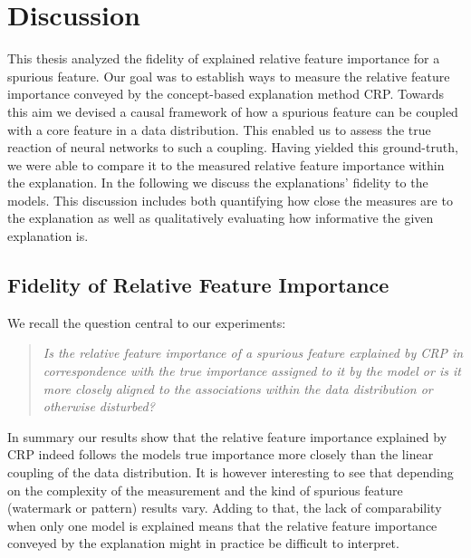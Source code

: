 \chapter{Discussion}\label{chapter:discussion}
This thesis analyzed the fidelity of explained relative feature importance for a spurious feature. 
Our goal was to establish ways to measure the relative feature importance conveyed by the concept-based explanation method CRP.
Towards this aim we devised a causal framework of how a spurious feature can be coupled with a core feature in a data distribution. This enabled us to assess the true reaction of neural networks to such a coupling. Having yielded this ground-truth, we were able to compare it to the measured relative feature importance within the explanation. 
In the following we discuss the explanations' fidelity to the models. This discussion includes both quantifying how close the measures are to the explanation as well as qualitatively evaluating how informative the given explanation is. 

\section{Fidelity of Relative Feature Importance}
We recall the question central to our experiments:
\begin{quote}
    \textit{Is the relative feature importance of a spurious feature explained by CRP in correspondence with the true importance assigned to it by the model or is it more closely aligned to the associations within the data distribution or otherwise disturbed?}
\end{quote}

In summary our results show that the relative feature importance explained by CRP indeed follows the models true importance more closely than the linear coupling of the data distribution. 
It is however interesting to see that depending on the complexity of the measurement and the kind of spurious feature (watermark or pattern) results vary. 
Adding to that, the lack of comparability when only one model is explained means that the relative feature importance conveyed by the explanation might in practice be difficult to interpret.   

